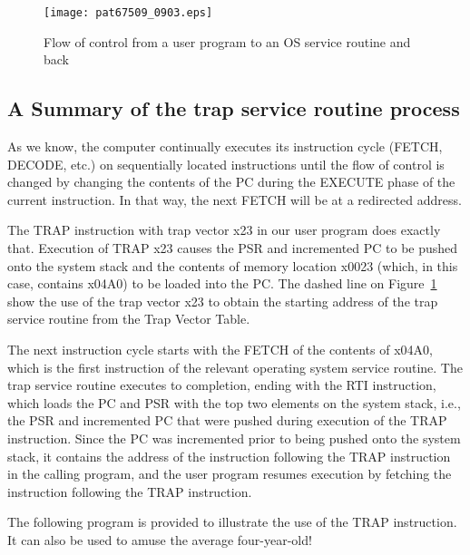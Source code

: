 \documentclass{patt}
\begin{document}
\begin{figure}[h!]
\centerline{\texttt{[image: pat67509\_0903.eps]}}
\caption{Flow of control from a user program to an OS service routine and back}
\label{fig:trap}
\end{figure}

\subsection{A Summary of the trap service routine process}

As we know, the computer continually executes its instruction cycle
(FETCH, DECODE, etc.) on sequentially located instructions until the flow of 
control is changed by changing the contents of the PC during the EXECUTE 
phase of the current instruction.  In that way, the next FETCH will be at 
a redirected address.

The TRAP instruction with trap vector x23 in our user program does exactly
that.  Execution of TRAP x23 causes the PSR and incremented PC to be pushed 
onto the system stack and the contents of memory location x0023 
(which, in this case, contains x04A0) to be loaded into the PC.
The dashed line on Figure~\ref{fig:trap} show the use of the
trap vector x23 to obtain the starting address of the trap service routine
from the Trap Vector Table.

The next instruction cycle starts with the FETCH of the contents of
x04A0, which is the first instruction of the relevant operating system service
routine.  The trap service routine executes to completion, ending with the 
RTI instruction, which loads the PC and PSR with the top two elements on the
system stack, i.e., the PSR and incremented PC that were pushed during 
execution of the TRAP instruction.  Since the PC was incremented prior to being
pushed onto the system stack, it contains the address of the 
instruction following the TRAP instruction in the calling program, and
the user program resumes execution by fetching the instruction following the
TRAP instruction.

The following program is provided to illustrate the use of
the TRAP instruction.  It can also be used to amuse the average four-year-old!
\end{document}
